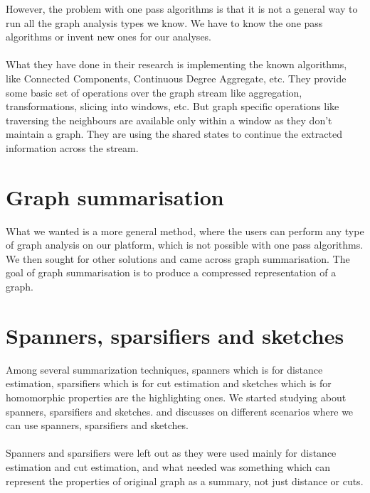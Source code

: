 \documentclass[12pt]{report}
\numberwithin{figure}{section}
\numberwithin{table}{section}
\begin{document}
However, the problem with one pass algorithms is that it is not a general way to run all the graph analysis types we know. We have to know the one pass algorithms or invent new ones for our analyses. 

\paragraph{}

What they have done in their research is implementing the known algorithms, like Connected Components, Continuous Degree Aggregate, etc. They provide some basic set of operations over the graph stream like aggregation, transformations, slicing into windows, etc. But graph specific operations like traversing the neighbours are available only within a window as they don’t maintain a graph. They are using the shared states to continue the extracted information across the stream.

\section{Graph summarisation}

What we wanted is a more general method, where the users can perform any type of graph analysis on our platform, which is not possible with one pass algorithms. We then sought for other solutions and came across graph summarisation. The goal of graph summarisation is to produce a compressed representation of a graph. 

\section{Spanners, sparsifiers and sketches}

Among several summarization techniques, spanners which is for distance estimation, sparsifiers which is for cut estimation and sketches which is for homomorphic properties are the highlighting ones. We started studying about spanners, sparsifiers and sketches. \cite{Graph sketches} and \cite{Graph stream algorithms survey} discusses on different scenarios where we can use spanners, sparsifiers and sketches.

\paragraph{}

Spanners and sparsifiers were left out as they were used mainly for distance estimation and cut estimation, and what needed was something which can represent the properties of original graph as a summary, not just distance or cuts.
\end{document}
